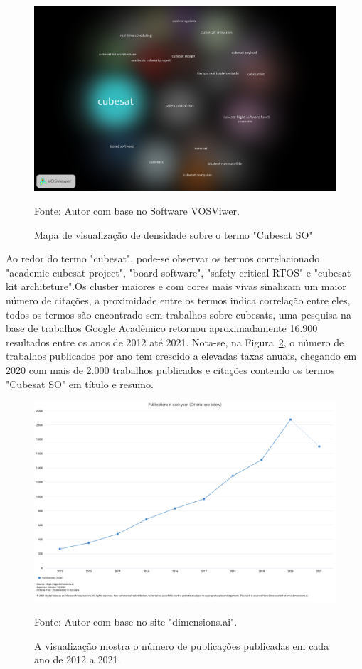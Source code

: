 \begin{figure}[H]
	\centering
	\includegraphics[width=15cm]{imagens/Cubesat_density_central.png}
	\caption{Mapa de visualização de densidade sobre o termo "Cubesat SO"}
	Fonte: Autor com base no Software VOSViwer.
	\label{fig: Cubesat Density Visualization}
\end{figure}

Ao redor do termo "cubesat", pode-se observar os termos correlacionado "academic cubesat project", 
"board software", "safety critical RTOS" e "cubesat kit architeture".Os cluster maiores e com cores mais 
vivas sinalizam um maior número de citações, a proximidade entre os termos indica correlação entre eles, 
todos os termos são encontrado sem trabalhos sobre cubesats, uma pesquisa na base de trabalhos Google 
Acadêmico retornou aproximadamente 16.900 resultados entre os anos de 2012 até 2021. Nota-se, na 
Figura~\ref{fig: Cubesat Published}, o número de trabalhos publicados por ano tem crescido a elevadas 
taxas anuais, chegando em 2020 com mais de 2.000 trabalhos publicados e citações contendo os termos 
"Cubesat SO" em título e resumo.


\begin{figure}[H]
	\centering
	\includegraphics[width=15cm]{imagens/cubesat_publicados.png}
	\caption{A visualização mostra o número de publicações publicadas em cada ano de 2012 a 2021.}
	Fonte: Autor com base no site "dimensions.ai".
	\label{fig: Cubesat Published}
\end{figure}

